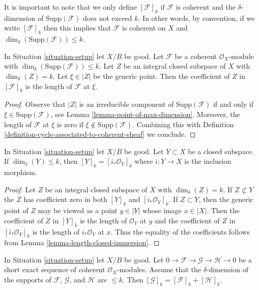 \noindent
It is important to note that we only define $[\mathcal{F}]_k$
if $\mathcal{F}$ is coherent and the $\delta$-dimension
of $\text{Supp}(\mathcal{F})$ does not exceed $k$. In other words,
by convention, if we write $[\mathcal{F}]_k$ then this implies that
$\mathcal{F}$ is coherent on $X$ and
$\dim_\delta(\text{Supp}(\mathcal{F})) \leq k$.

\begin{lemma}
\label{lemma-reformulate-coeff-coherent}
In Situation \ref{situation-setup} let $X/B$ be good.
Let $\mathcal{F}$ be a coherent $\mathcal{O}_X$-module
with $\dim_\delta(\text{Supp}(\mathcal{F})) \leq k$.
Let $Z$ be an integral closed subspace of $X$ with $\dim_\delta(Z) = k$.
Let $\xi \in |Z|$ be the generic point.
Then the coefficient of $Z$ in $[\mathcal{F}]_k$
is the length of $\mathcal{F}$ at $\xi$.
\end{lemma}

\begin{proof}
Observe that $|Z|$ is an irreducible component of $\text{Supp}(\mathcal{F})$
if and only if $\xi \in \text{Supp}(\mathcal{F})$, see
Lemma \ref{lemma-point-of-max-dimension}.
Moreover, the length of $\mathcal{F}$ at $\xi$ is zero if
$\xi \not \in \text{Supp}(\mathcal{F})$. Combining this
with Definition \ref{definition-cycle-associated-to-coherent-sheaf}
we conclude.
\end{proof}

\begin{lemma}
\label{lemma-cycle-closed-coherent}
In Situation \ref{situation-setup} let $X/B$ be good.
Let $Y \subset X$ be a closed subspace.
If $\dim_\delta(Y) \leq k$, then $[Y]_k = [i_*\mathcal{O}_Y]_k$
where $i : Y \to X$ is the inclusion morphism.
\end{lemma}

\begin{proof}
Let $Z$ be an integral closed subspace of $X$ with $\dim_\delta(Z) = k$.
If $Z \not \subset Y$ the $Z$ has coefficient zero in both
$[Y]_k$ and $[i_*\mathcal{O}_Y]_k$. If $Z \subset Y$, then
the generic point of $Z$ may be viewed as a point $y \in |Y|$
whose image $x \in |X|$. Then the coefficient of $Z$ in
$[Y]_k$ is the length of $\mathcal{O}_Y$ at $y$ and the
coefficient of $Z$ in $[i_*\mathcal{O}_Y]_k$ is the length
of $i_*\mathcal{O}_Y$ at $x$. Thus the equality of the coefficients
follows from Lemma \ref{lemma-length-closed-immersion}.
\end{proof}

\begin{lemma}
\label{lemma-additivity-sheaf-cycle}
In Situation \ref{situation-setup} let $X/B$ be good.
Let $0 \to \mathcal{F} \to \mathcal{G} \to \mathcal{H} \to 0$
be a short exact sequence of coherent $\mathcal{O}_X$-modules.
Assume that the $\delta$-dimension of the supports
of $\mathcal{F}$, $\mathcal{G}$, and $\mathcal{H}$ are $\leq k$.
Then $[\mathcal{G}]_k = [\mathcal{F}]_k + [\mathcal{H}]_k$.
\end{lemma}

